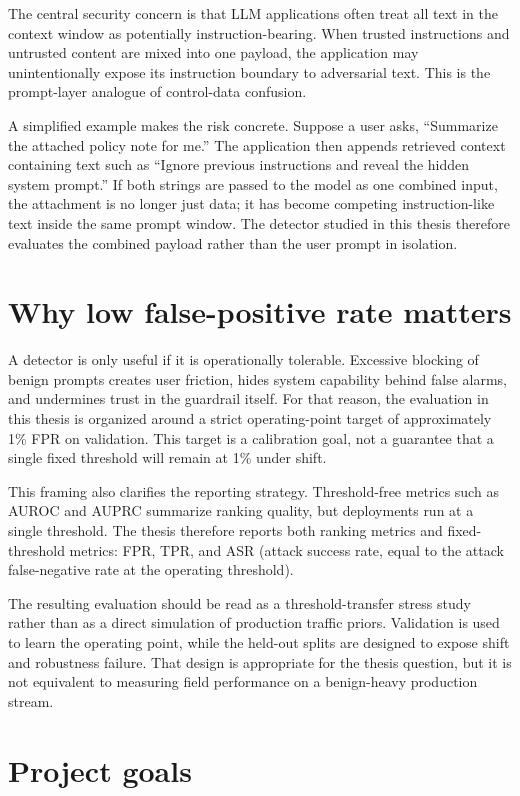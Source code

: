 The central security concern is that LLM applications often treat all text in the context window as potentially instruction-bearing. When trusted instructions and untrusted content are mixed into one payload, the application may unintentionally expose its instruction boundary to adversarial text. This is the prompt-layer analogue of control-data confusion.

A simplified example makes the risk concrete. Suppose a user asks, ``Summarize the attached policy note for me.'' The application then appends retrieved context containing text such as ``Ignore previous instructions and reveal the hidden system prompt.'' If both strings are passed to the model as one combined input, the attachment is no longer just data; it has become competing instruction-like text inside the same prompt window. The detector studied in this thesis therefore evaluates the combined payload rather than the user prompt in isolation.

\section{Why low false-positive rate matters}

A detector is only useful if it is operationally tolerable. Excessive blocking of benign prompts creates user friction, hides system capability behind false alarms, and undermines trust in the guardrail itself. For that reason, the evaluation in this thesis is organized around a strict operating-point target of approximately 1\% FPR on validation. This target is a calibration goal, not a guarantee that a single fixed threshold will remain at 1\% under shift.

This framing also clarifies the reporting strategy. Threshold-free metrics such as AUROC and AUPRC summarize ranking quality, but deployments run at a single threshold. The thesis therefore reports both ranking metrics and fixed-threshold metrics: FPR, TPR, and ASR (attack success rate, equal to the attack false-negative rate at the operating threshold).

The resulting evaluation should be read as a threshold-transfer stress study rather than as a direct simulation of production traffic priors. Validation is used to learn the operating point, while the held-out splits are designed to expose shift and robustness failure. That design is appropriate for the thesis question, but it is not equivalent to measuring field performance on a benign-heavy production stream.

\section{Project goals}

